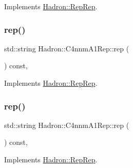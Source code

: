 Implements \mbox{\hyperlink{structHadron_1_1RepRep_ab3213025f6de249f7095892109575fde}{Hadron\+::\+Rep\+Rep}}.

\mbox{\label{structHadron_1_1C4nnmA1Rep_a9d7705f3d1e605e81c8c5a603bffb361}} 
\subsubsection{\texorpdfstring{rep()}{rep()}\hspace{0.1cm}{\footnotesize\ttfamily [3/5]}}
{\footnotesize\ttfamily std\+::string Hadron\+::\+C4nnm\+A1\+Rep\+::rep (\begin{DoxyParamCaption}{ }\end{DoxyParamCaption}) const\hspace{0.3cm}{\ttfamily [inline]}, {\ttfamily [virtual]}}



Implements \mbox{\hyperlink{structHadron_1_1RepRep_ab3213025f6de249f7095892109575fde}{Hadron\+::\+Rep\+Rep}}.

\mbox{\label{structHadron_1_1C4nnmA1Rep_a9d7705f3d1e605e81c8c5a603bffb361}} 
\subsubsection{\texorpdfstring{rep()}{rep()}\hspace{0.1cm}{\footnotesize\ttfamily [4/5]}}
{\footnotesize\ttfamily std\+::string Hadron\+::\+C4nnm\+A1\+Rep\+::rep (\begin{DoxyParamCaption}{ }\end{DoxyParamCaption}) const\hspace{0.3cm}{\ttfamily [inline]}, {\ttfamily [virtual]}}



Implements \mbox{\hyperlink{structHadron_1_1RepRep_ab3213025f6de249f7095892109575fde}{Hadron\+::\+Rep\+Rep}}.

\mbox{\label{structHadron_1_1C4nnmA1Rep_a9d7705f3d1e605e81c8c5a603bffb361}} 
